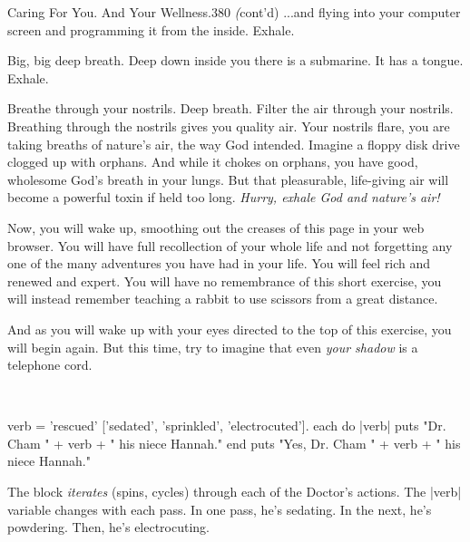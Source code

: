 \documentclass[12pt,twoside]{report}
\begin{document}
	\begin{sidebar}{Caring For You. And Your Wellness.}{380}
		\textit(cont'd) ...and flying into your computer screen and programming it from the inside. Exhale.\vspace{6pt}

		Big, big deep breath. Deep down inside you there is a submarine. It has a tongue. Exhale.\vspace{6pt}
		
		Breathe through your nostrils. Deep breath. Filter the air through your nostrils. Breathing through the nostrils gives you quality air. Your nostrils flare, you are taking breaths of nature's air, the way God intended. Imagine a floppy disk drive clogged up with orphans. And while it chokes on orphans, you have good, wholesome God's breath in your lungs. But that pleasurable, life-giving air will become a powerful toxin if held too long. \textit{Hurry, exhale God and nature's air!}\vspace{6pt}
		
		Now, you will wake up, smoothing out the creases of this page in your web browser. You will have full recollection of your whole life and not forgetting any one of the many adventures you have had in your life. You will feel rich and renewed and expert. You will have no remembrance of this short exercise, you will instead remember teaching a rabbit to use scissors from a great distance.\vspace{6pt}
		
		And as you will wake up with your eyes directed to the top of this exercise, you will begin again. But this time, try to imagine that even \textit{your shadow} is a telephone cord.\vspace{6pt}
	\end{sidebar}

\ %
\vspace*{-36pt}

\begin{rubycode}

 verb = 'rescued'
 ['sedated', 'sprinkled', 'electrocuted'].
 each do |verb|
   puts "Dr. Cham " + verb + " his niece Hannah."
 end
 puts "Yes, Dr. Cham " + verb + " his niece Hannah."

\end{rubycode}


The block {\em iterates} (spins, cycles) through each of the Doctor's
actions.  The \rubyinline|verb| variable changes with
each pass.  In one pass, he's sedating.  In the next, he's powdering.
Then, he's electrocuting.
\end{document}
